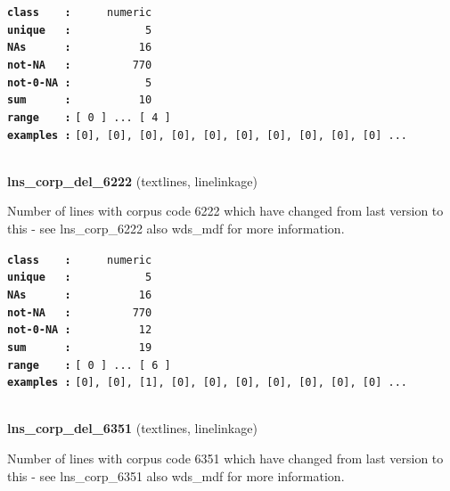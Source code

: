\documentclass[]{article}
\begin{document}
\textbf{\texttt{class\ \ \ \ :}} \texttt{~~~~~numeric}\\
\textbf{\texttt{unique\ \ \ :}} \texttt{~~~~~~~~~~~5}\\
\textbf{\texttt{NAs\ \ \ \ \ \ :}} \texttt{~~~~~~~~~~16}\\
\textbf{\texttt{not-NA\ \ \ :}} \texttt{~~~~~~~~~770}\\
\textbf{\texttt{not-0-NA\ :}} \texttt{~~~~~~~~~~~5}\\
\textbf{\texttt{sum\ \ \ \ \ \ :}} \texttt{~~~~~~~~~~10}\\
\textbf{\texttt{range\ \ \ \ :}}
\texttt{{[}\ 0\ {]}\ ...\ {[}\ 4\ {]}}\\
\textbf{\texttt{examples\ :}}
\texttt{{[}0{]},\ {[}0{]},\ {[}0{]},\ {[}0{]},\ {[}0{]},\ {[}0{]},\ {[}0{]},\ {[}0{]},\ {[}0{]},\ {[}0{]}\ ...}\\

~

\textbf{lns\_corp\_del\_6222} (textlines, linelinkage)

Number of lines with corpus code 6222 which have changed from last
version to this - see lns\_corp\_6222 also wds\_mdf for more
information.

\textbf{\texttt{class\ \ \ \ :}} \texttt{~~~~~numeric}\\
\textbf{\texttt{unique\ \ \ :}} \texttt{~~~~~~~~~~~5}\\
\textbf{\texttt{NAs\ \ \ \ \ \ :}} \texttt{~~~~~~~~~~16}\\
\textbf{\texttt{not-NA\ \ \ :}} \texttt{~~~~~~~~~770}\\
\textbf{\texttt{not-0-NA\ :}} \texttt{~~~~~~~~~~12}\\
\textbf{\texttt{sum\ \ \ \ \ \ :}} \texttt{~~~~~~~~~~19}\\
\textbf{\texttt{range\ \ \ \ :}}
\texttt{{[}\ 0\ {]}\ ...\ {[}\ 6\ {]}}\\
\textbf{\texttt{examples\ :}}
\texttt{{[}0{]},\ {[}0{]},\ {[}1{]},\ {[}0{]},\ {[}0{]},\ {[}0{]},\ {[}0{]},\ {[}0{]},\ {[}0{]},\ {[}0{]}\ ...}\\

~

\textbf{lns\_corp\_del\_6351} (textlines, linelinkage)

Number of lines with corpus code 6351 which have changed from last
version to this - see lns\_corp\_6351 also wds\_mdf for more
information.
\end{document}
